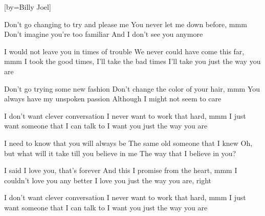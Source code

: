 [by={Billy Joel}]

  \chordsoff

  \beginverse
  Don't go changing to try and please me
  You never let me down before, mmm
  Don't imagine you're too familiar
  And I don't see you anymore
  \endverse

  \beginverse
  I would not leave you in times of trouble
  We never could have come this far, mmm
  I took the good times, I'll take the bad times
  I'll take you just the way you are
  \endverse

  \beginverse
  Don't go trying some new fashion
  Don't change the color of your hair, mmm
  You always have my unspoken passion
  Although I might not seem to care
  \endverse

  \beginverse
  I don't want clever conversation
  I never want to work that hard, mmm
  I just want someone that I can talk to
  I want you just the way you are
  \endverse

  \beginverse
  I need to know that you will always be
  The same old someone that I knew
  Oh, but what will it take till you believe in me
  The way that I believe in you?
  \endverse

  \beginverse
  I said I love you, that's forever
  And this I promise from the heart, mmm
  I couldn't love you any better
  I love you just the way you are, right
  \endverse

  \beginverse
  I don't want clever conversation
  I never want to work that hard, mmm
  I just want someone that I can talk to
  I want you just the way you are
  \endverse
\endsong
